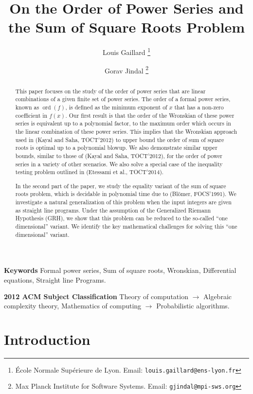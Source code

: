 \documentclass[a4paper, 11pt,dvipsnames]{article}
\author{Louis Gaillard \thanks{{\'E}cole Normale Sup{\'e}rieure de Lyon. Email: \texttt{louis.gaillard@ens-lyon.fr}} \and Gorav Jindal \thanks{Max Planck Institute for Software Systems. Email: \texttt{gjindal@mpi-sws.org}}}
\newcommand{\ord}{\operatorname{ord}}
\providecommand{\keywords}[1]
{\noindent \textbf{Keywords } #1
}
\begin{document}
  \title{On the Order of Power Series and the Sum of Square Roots Problem}

\maketitle
\begin{abstract}

  This  paper focuses on the study of the order of power series that are linear combinations of a given finite set of power series. The order of a formal power series, known as $\ord(f)$, is defined as the minimum exponent of $x$ that has a non-zero coefficient in $f(x)$. Our first result is that the order of the Wronskian of these power series is equivalent up to a polynomial factor, to the maximum order which occurs in the linear combination of these power series. This implies that the Wronskian approach used in (Kayal and Saha, TOCT'2012) to upper bound the order of sum of square roots is optimal up to a polynomial blowup. We also demonstrate similar upper bounds, similar to those of (Kayal and Saha, TOCT'2012), for the order of power series in a variety of other scenarios. We also solve a special case of the inequality testing problem outlined in (Etessami et al., TOCT'2014).

  In the second part of the paper, we study the equality variant of the sum of square roots problem, which is decidable in polynomial time due to (Bl\"omer, FOCS'1991). We investigate a natural generalization of this problem when the input integers are given as straight line programs. Under the assumption of the Generalized Riemann Hypothesis (GRH), we show that this problem can be reduced to the so-called ``one dimensional'' variant. We identify the key mathematical challenges for solving this ``one dimensional'' variant.
\end{abstract}
\keywords{Formal power series, Sum of square roots, Wronskian, Differential equations, Straight line Programs.}

\noindent \textbf{2012 ACM Subject Classification }Theory of computation $\to$ Algebraic complexity theory, Mathematics of computing $\to$ Probabilistic algorithms.
 \maketitle

\section{Introduction}
\end{document}
